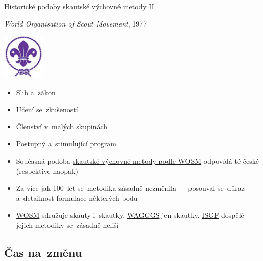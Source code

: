 \documentclass[compress, ucs, xelatex, 11pt, xcolor=dvipsnames, print, aspectratio=169,
	hyperref={
		bookmarks=true,
		unicode=true,
		colorlinks=true,
		pdftitle={Skautska vychovna metoda},
		plainpages=false,
		pdfauthor={Vojtech Zeisek},
		pdfsubject={Skautska vychovna metoda a jeji vyvoj za posledni stoleti a desetileti},
		pdfcreator={XeLaTeX},
		pdfkeywords={Junak, Pedagogika, Skaut, Skauting, Vychovna metoda},
		linkcolor=Red, %
		anchorcolor=ForestGreen, %
		citecolor=ForestGreen, %
		filecolor=ForestGreen, %
		menucolor=ForestGreen, %
		urlcolor=Sepia, %
		pdftex},
	url={hyphens, lowtilde} %
	]{beamer}
\begin{document}
\begin{frame}{Historické podoby skautské výchovné metody II}
	\begin{multicols}{2}
		\textit{World Organisation of Scout Movement}, 1977
		\begin{center}
			\includegraphics[width=2cm]{wosm.jpg}
		\end{center}
		\begin{itemize}
			\item Slib a~zákon
			\item Učení se~zkušeností
			\item Členství v~malých skupinách
			\item Postupný a~stimulující program
		\end{itemize}
	\end{multicols}
	\begin{itemize}
		\item Současná podoba \href{https://www.scout.org/method}{skautské výchovné metody podle WOSM} odpovídá té české (respektive naopak)
		\item Za více jak 100~let se~metodika zásadně nezměnila --- posouval se~důraz a~detailnost formulace některých bodů
		\item \href{https://www.scout.org/}{WOSM} sdružuje skauty i~skautky, \href{https://www.wagggs.org/}{WAGGGS} jen skautky, \href{http://www.isgf.org/}{ISGF} dospělé --- jejich metodiky se~zásadně neliší
	\end{itemize}
\end{frame}

\subsection{Čas na~změnu}
\end{document}

